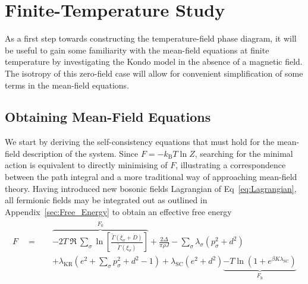 \documentclass[12pt]{article}
\begin{document}

\section{Finite-Temperature Study}

As a first step towards constructing the temperature-field phase diagram, it will be useful to gain some familiarity with the mean-field equations at finite temperature by investigating the Kondo model in the absence of a magnetic field. The isotropy of this zero-field case will allow for convenient simplification of some terms in the mean-field equations.

\subsection{Obtaining Mean-Field Equations}

We start by deriving the self-consistency equations that must hold for the mean-field description of the system. Since $ F = - k_{\text{B}} T \ln{Z} $, searching for the minimal action is equivalent to directly minimising of $ F $, illustrating a correspondence between the path integral and a more traditional way of approaching mean-field theory. Having introduced new bosonic fields Lagrangian of Eq~\eqref{eq:Lagrangian}, all fermionic fields may be integrated out as outlined in Appendix~\ref{sec:Free_Energy} to obtain an effective free energy
\begin{align}
\begin{split}
F \quad = \quad & \overbrace{- 2 T~\Re~{\sum_{\sigma}\ln{\left[\frac{\widetilde{\Gamma}(\xi_{\sigma} + D)}{\widetilde{\Gamma}(\xi_{\sigma})} \right]}}}^{F_0} + \frac{2 \Delta}{\pi \rho J} - \sum_{\sigma} \lambda_{\sigma} (p_{\sigma}^2 + d^2)\\
&+ \lambda_{\text{KR}} (e^2 + \sum_{\sigma} p_{\sigma}^2 + d^2 - 1) + \lambda_{\text{SC}} (e^2 + d^2) \underbrace{- T \ln{\left( 1 + e^{\beta K \lambda_{\text{SC}}} \right)}}_{F_{\text{h}}}
\label{eq:Free_Energy}
\end{split}
\end{align}
\end{document}
